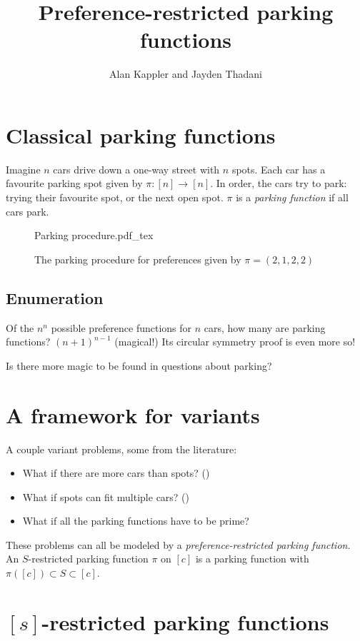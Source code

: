 \documentclass[thesis]{hmcposter}
\author{Alan Kappler and Jayden Thadani}
\title{Preference-restricted parking functions}
\newcommand{\incfig}[1]{%
    \def\svgwidth{0.8 \columnwidth}
    {#1.pdf_tex}
}
\begin{document}
\begin{poster}

\section{Classical parking functions}

Imagine $n$ cars drive down a one-way street with $n$ spots. Each car has a favourite parking spot given by $\pi:[n] \to [n]$. In order, the cars try to park: trying their favourite spot, or the next open spot. $\pi$ is a \emph{parking function} if all cars park.

\begin{figure}
    \centering
    \incfig{Parking procedure}
    \caption{The parking procedure for preferences given by $\pi = (2, 1, 2, 2)$}
    \label{fig:parking-procedure}
\end{figure}

\subsection{Enumeration}

Of the $n^n$ possible preference functions for $n$ cars, how many are parking functions? $(n + 1)^{n - 1}$ (magical!) Its circular symmetry proof is even more so!

Is there more magic to be found in questions about parking?

\section{A framework for variants}%

A couple variant problems, some from the literature:
\begin{itemize}
\item What if there are more cars than spots? (\cite{cameron-johannsen-prellberg-schweitzer-2008})
\item What if spots can fit multiple cars? (\cite{blake-konheim-1977})
\item What if all the parking functions have to be prime?
\end{itemize}

These problems can all be modeled by a \emph{preference-restricted parking function}. An $S$-restricted parking function $\pi$ on $[c]$ is a parking function with $\pi([c]) \subset S \subset [c]$.

\section{$[s]$-restricted parking functions}


\end{poster}
\end{document}
